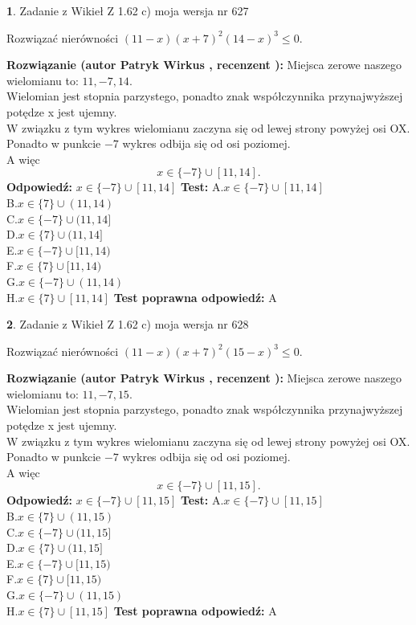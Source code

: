 \documentclass[12pt, a4paper]{article}
\theoremstyle{definition} %
\newtheorem{zad}{}
\newcommand{\zadStart}[1]{\begin{zad}#1\newline}
\newcommand{\zadStop}{\end{zad}}
\newcommand{\rozwStart}[2]{\noindent \textbf{Rozwiązanie (autor #1 , recenzent #2): }\newline}
\newcommand{\rozwStop}{\newline}
\newcommand{\odpStart}{\noindent \textbf{Odpowiedź:}\newline}
\newcommand{\odpStop}{\newline}
\newcommand{\testStart}{\noindent \textbf{Test:}\newline}
\newcommand{\testStop}{\newline}
\newcommand{\kluczStart}{\noindent \textbf{Test poprawna odpowiedź:}\newline}
\newcommand{\kluczStop}{\newline}
\begin{document}
\zadStart{Zadanie z Wikieł Z 1.62 c) moja wersja nr 627}

Rozwiązać nierówności $(11-x)(x+7)^{2}(14-x)^{3}\le0$.
\zadStop
\rozwStart{Patryk Wirkus}{}
Miejsca zerowe naszego wielomianu to: $11, -7, 14$.\\
Wielomian jest stopnia parzystego, ponadto znak współczynnika przy\linebreak najwyższej potędze x jest ujemny.\\ W związku z tym wykres wielomianu zaczyna się od lewej strony powyżej osi OX.\\
Ponadto w punkcie $-7$ wykres odbija się od osi poziomej.\\
A więc $$x \in \{-7\} \cup [11,14].$$
\rozwStop
\odpStart
$x \in \{-7\} \cup [11,14]$
\odpStop
\testStart
A.$x \in \{-7\} \cup [11,14]$\\
B.$x \in \{7\} \cup (11,14)$\\
C.$x \in \{-7\} \cup (11,14]$\\
D.$x \in \{7\} \cup (11,14]$\\
E.$x \in \{-7\} \cup [11,14)$\\
F.$x \in \{7\} \cup [11,14)$\\
G.$x \in \{-7\} \cup (11,14)$\\
H.$x \in \{7\} \cup [11,14]$
\testStop
\kluczStart
A
\kluczStop



\zadStart{Zadanie z Wikieł Z 1.62 c) moja wersja nr 628}

Rozwiązać nierówności $(11-x)(x+7)^{2}(15-x)^{3}\le0$.
\zadStop
\rozwStart{Patryk Wirkus}{}
Miejsca zerowe naszego wielomianu to: $11, -7, 15$.\\
Wielomian jest stopnia parzystego, ponadto znak współczynnika przy\linebreak najwyższej potędze x jest ujemny.\\ W związku z tym wykres wielomianu zaczyna się od lewej strony powyżej osi OX.\\
Ponadto w punkcie $-7$ wykres odbija się od osi poziomej.\\
A więc $$x \in \{-7\} \cup [11,15].$$
\rozwStop
\odpStart
$x \in \{-7\} \cup [11,15]$
\odpStop
\testStart
A.$x \in \{-7\} \cup [11,15]$\\
B.$x \in \{7\} \cup (11,15)$\\
C.$x \in \{-7\} \cup (11,15]$\\
D.$x \in \{7\} \cup (11,15]$\\
E.$x \in \{-7\} \cup [11,15)$\\
F.$x \in \{7\} \cup [11,15)$\\
G.$x \in \{-7\} \cup (11,15)$\\
H.$x \in \{7\} \cup [11,15]$
\testStop
\kluczStart
A
\kluczStop
\end{document}
